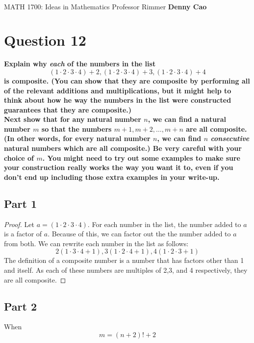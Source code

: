 \documentclass[article, 12pt]{article}
\title{\LARGE\bf{\psetName}}
\author{\name}
\date{\dueDate}
\author{\name}
\date{\dueDate}
\makeatletter
\theoremstyle{definition}
\newcommand{\courseNumber}{MATH 1700}
\newcommand{\courseName}{Ideas in Mathematics}
\newcommand{\professor}{Professor Rimmer}
\newcommand{\name}{Denny Cao}
\renewcommand{\maketitle}{\bgroup\setlength{\parindent}{0pt}
    \begin{flushleft}
        \textbf{\@title} \\ \vskip0.2cm
        \begingroup
            \fontsize{14pt}{12pt}\selectfont
            \courseNumber: \courseName 
            \vskip0.3cm 
            \professor
        \endgroup \vskip0.3cm
        \@date \hfill\rlap{}\bf{\name} \\ \vskip0.1cm
        \hrulefill
    \end{flushleft}\egroup 
}
\makeatother
\begin{document}
    \maketitle
    \thispagestyle{plain}
    
    \section*{Question 12}
    \doublespacing
    \textbf{Explain why \textit{each} of the numbers in the list}
    \[ (1 \cdot 2 \cdot 3 \cdot 4) + 2, (1 \cdot 2 \cdot 3 \cdot 4) + 3, (1 \cdot 2 \cdot 3 \cdot 4) + 4\]
    \textbf{is composite. (You can show that they are composite by performing all of the relevant additions and multiplications, but it might help to think about how he way the numbers in the list were constructed guarantees that they are composite.)}
    \\[12pt]
    \textbf{Next show that for any natural number $n$, we can find a natural number $m$ so that the numbers $m+1,m+2,\dots,m+n$ are all composite. (In other words, for every natural number $n$, we can find $n$ \textit{consecutive} natural numbers which are all composite.) Be very careful with your choice of $m$. You might need to try out some examples to make sure your construction really works the way you want it to, even if you don't end up including those extra examples in your write-up.}
    \pagebreak
    \subsection*{Part 1}
    \begin{proof}
        Let $a = (1 \cdot 2 \cdot 3 \cdot 4)$. For each number in the list, the number added to $a$ is a factor of $a$. Because of this, we can factor out the the number added to $a$ from both. We can rewrite each number in the list as follows:
        \[ 2(1 \cdot 3 \cdot 4 + 1), 3(1 \cdot 2 \cdot 4 + 1), 4(1 \cdot 2 \cdot 3 + 1) \]
        The definition of a composite number is a number that has factors other than 1 and itself. As each of these numbers are multiples of 2,3, and 4 respectively, they are all composite.
    \end{proof}
    \subsection*{Part 2}
    When 
    \[ m = (n+2)! + 2 \]
\end{document}
